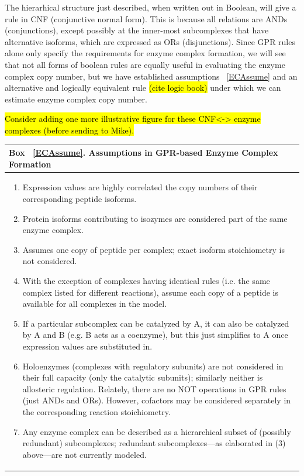 \documentclass[phd,tocprelim]{cornell}
\theoremstyle{break}
\begin{document}
The hierarhical structure just described, when written out in Boolean,
will give a rule in CNF (conjunctive normal form). This is because all
relations are ANDs (conjunctions), except possibly at the inner-most
subcomplexes that have alternative isoforms, which are expressed as
ORs (disjunctions). Since GPR rules alone only specify the
requirements for enzyme complex formation, we will see that not all
forms of boolean rules are equally useful in evaluating the enzyme
complex copy number, but we have established assumptions
~\ref{ECAssume} and an alternative and logically equivalent rule
\hl{(cite logic book)} under which we can estimate enzyme complex copy
number.

\hl{Consider adding one more illustrative figure for these CNF<-> enzyme complexes (before sending to Mike).}


\label{ECAssume}
\begin{center}
\begin{tabular}{| p{14cm} |}
\hline
\textbf{Box ~\ref{ECAssume}. Assumptions in GPR-based Enzyme Complex Formation} \\
\hline
\begin{enumerate}
\item Expression values are highly correlated the copy numbers of their corresponding 
peptide isoforms. 
\item Protein isoforms contributing to isozymes are considered part of the same enzyme complex.
\item Assumes one copy of peptide per complex; exact isoform stoichiometry is not considered. 
\item With the exception of complexes having identical rules (i.e. the same complex listed for 
different reactions), assume each copy of a peptide 
is available for all complexes in the model.
\item If a particular subcomplex can be catalyzed by A, it can also be catalyzed by A and B (e.g.
B acts as a coenzyme), but this just simplifies to A once expression values are substituted in.
\item Holoenzymes (complexes with regulatory subunits) are not considered in their full capacity 
(only the catalytic subunits);  similarly neither is allosteric regulation. Relately, there are no
NOT operations in GPR rules (just ANDs and ORs). However, cofactors may be considered separately in 
the corresponding reaction stoichiometry.
\item Any enzyme complex can be described as a hierarchical subset of (possibly redundant)
subcomplexes; redundant subcomplexes---as elaborated in (3) above---are not currently modeled. 
\end{enumerate} \\
\hline
\end{tabular}
\end{center}
\end{document}

